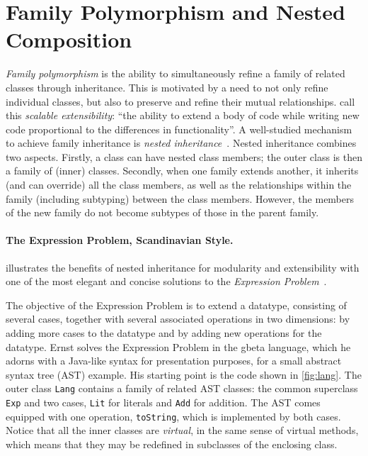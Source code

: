\section{Family Polymorphism and Nested Composition}
\label{sec:ernst}

\emph{Family polymorphism} is the ability to simultaneously refine a family of
related classes through inheritance. This is motivated by a need to not only
refine individual classes, but also to preserve and refine their mutual
relationships. \citet{Nystrom_2004} call this \emph{scalable extensibility}:
``the ability to extend a body of code while writing new code proportional to
the differences in functionality''.
%
A well-studied mechanism to achieve family inheritance is \emph{nested
inheritance}~\citep{Nystrom_2004}. Nested inheritance combines two aspects.
Firstly, a class can have nested class members; the outer class is then a
family of (inner) classes. Secondly, when one family extends another, it
inherits (and can override) all the class members, as well as the relationships
within the family (including subtyping) between the class members. However,
the members of the new family do not become subtypes of those in the parent family.

\paragraph{The Expression Problem, Scandinavian Style.}

\citet{Ernst_2001} illustrates the benefits of nested inheritance for modularity
and extensibility with one of the most elegant and concise solutions to the
\emph{Expression Problem}~\citep{wadler1998expression}.


The objective of the
Expression Problem is to extend a datatype, consisting of several cases,
together with several associated operations in two dimensions: by adding more
cases to the datatype and by adding new operations for the datatype. Ernst
solves the Expression Problem in the gbeta language, which he adorns with a
Java-like syntax for presentation purposes, for a small abstract syntax tree
(AST) example. His starting point is the code shown in \cref{fig:lang}. The
outer class \lstinline{Lang} contains a family of related AST classes: the
common superclass \lstinline{Exp} and two cases, \lstinline{Lit} for literals
and \lstinline{Add} for addition. The AST comes equipped with one operation,
\lstinline{toString}, which is implemented by both cases. Notice that all the
inner classes are \textit{virtual}, in the same sense of virtual methods, which
means that they may be redefined in subclasses of the enclosing class.


